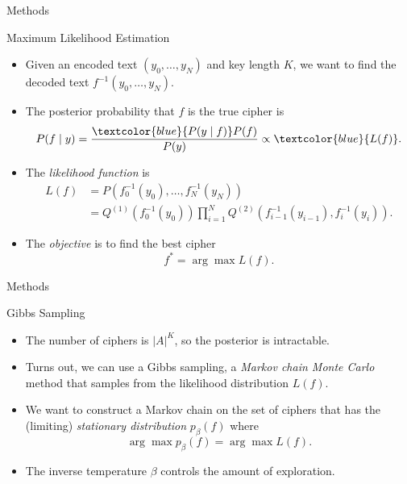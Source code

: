 \documentclass{beamer}
\begin{document}

\begin{frame}{Methods}

\begin{block}{Maximum Likelihood Estimation}
\begin{itemize}
\item Given an encoded text $(y_{0}, \ldots, y_{N})$ and key length $K$, we want to find the decoded text $f^{-1}(y_{0}, \ldots, y_{N})$.
\item The posterior probability that $f$ is the true cipher is
$$P(f \mid y) = \frac{\textcolor{blue}{P(y \mid f)}P(f)}{P(y)} \propto \textcolor{blue}{L(f)}.$$
\item The \textit{likelihood function} is 
\begin{align*}
{L(f)} &= P(f_{0}^{-1}(y_{0}), \ldots, f_{N}^{-1}(y_{N})) \\
      &= Q^{(1)}(f_{0}^{-1}(y_{0})) \prod_{i=1}^{N} Q^{(2)}(f_{i-1}^{-1}(y_{i-1}), f_{i}^{-1}(y_{i})).
\end{align*}
\item The \textit{objective} is to find the best cipher
$$f^{*} = \arg\max L(f).$$
\end{itemize}
\end{block}

\end{frame}


\begin{frame}{Methods}

\begin{block}{Gibbs Sampling \cite{menon2020pattern}}
\begin{itemize}
\item The number of ciphers is $|A|^{K}$, so the posterior is intractable.
\item Turns out, we can use a Gibbs sampling, a \textit{Markov chain Monte Carlo} method that samples from the likelihood distribution $L(f)$.
\item We want to construct a Markov chain on the set of ciphers that has the (limiting) \textit{stationary distribution} $p_{\beta}(f)$ where 
$$\arg\max p_{\beta}(f) = \arg\max L(f).$$
\item The inverse temperature $\beta$ controls the amount of exploration.
\end{itemize}
\end{block}

\end{frame}
\end{document}
